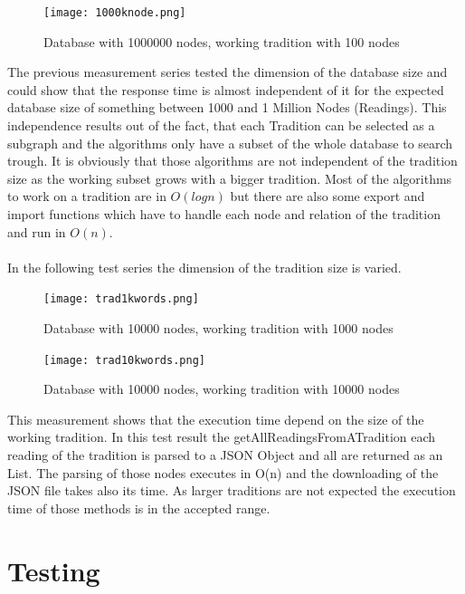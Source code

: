 \documentclass[11pt,fleqn,openany]{book} %
\begin{document}
\begin{figure}[h!]
  \caption{Database with 1000000 nodes,  working tradition with 100 nodes }
  \centering
    \texttt{[image: 1000knode.png]}
\end{figure}
The previous measurement series tested the dimension of the database size and could show that the response time is almost independent of it for the expected database size of something between 1000 and 1 Million Nodes (Readings). This independence results out of the fact, that each Tradition can be selected as a subgraph and the algorithms only have a subset of the whole database to search trough. It is obviously that those algorithms are not independent of the tradition size as the working subset grows with a bigger tradition. Most of the algorithms to work on a tradition are in $O(log n)$ but there are also some export and import functions which have to handle each node and relation of the tradition and run in $O(n)$. 
\\ \quad \\
In the following test series the dimension of the tradition size is varied. 
\begin{figure}[h!]
  \caption{Database with 10000 nodes,  working tradition with 1000 nodes }
  \centering
    \texttt{[image: trad1kwords.png]}
\end{figure}
\begin{figure}[h!]
  \caption{Database with 10000 nodes,  working tradition with 10000 nodes }
  \centering
    \texttt{[image: trad10kwords.png]}
\end{figure}
This measurement shows that the execution time depend on the size of the working tradition. In this test result the getAllReadingsFromATradition each reading of the tradition is parsed to a JSON Object and all are returned as an List. The parsing of those nodes executes in O(n) and the downloading of the JSON file takes also its time. As larger traditions are not expected the execution time of those methods is in the accepted range.


\part{Testing}

\end{document}
